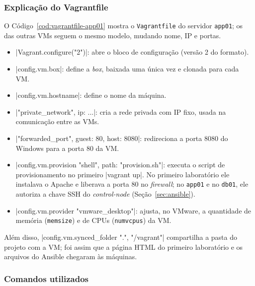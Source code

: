 \subsubsection{Explicação do Vagrantfile}

O Código~\ref{cod:vagrantfile-app01} mostra o \texttt{Vagrantfile} do servidor \texttt{app01}; os das
outras VMs seguem o mesmo modelo, mudando nome, IP e portas.


\begin{itemize}
  \item \cod|Vagrant.configure("2")|: abre o bloco de configuração (versão 2 do formato).
  \item \cod|config.vm.box|: define a \textit{box}, baixada uma única vez e clonada para cada VM.
  \item \cod|config.vm.hostname|: define o nome da máquina.
  \item \cod|"private_network", ip: ...|: cria a rede privada com IP fixo, usada na comunicação
        entre as VMs.
  \item \cod|"forwarded_port", guest: 80, host: 8080|: redireciona a porta 8080 do Windows para a
        porta 80 da VM.
  \item \cod|config.vm.provision "shell", path: "provision.sh"|: executa o script de
        provisionamento no primeiro \cod|vagrant up|. No primeiro laboratório ele instalava o Apache
        e liberava a porta 80 no \textit{firewall}; no \texttt{app01} e no \texttt{db01}, ele
        autoriza a chave SSH do \textit{control-node} (Seção~\ref{sec:ansible}).
  \item \cod|config.vm.provider "vmware_desktop"|: ajusta, no VMware, a quantidade de memória
        (\texttt{memsize}) e de CPUs (\texttt{numvcpus}) da VM.
\end{itemize}

Além disso, \cod|config.vm.synced_folder ".", "/vagrant"| compartilha a pasta do projeto com a VM;
foi assim que a página HTML do primeiro laboratório e os arquivos do Ansible chegaram às máquinas.

\subsubsection{Comandos utilizados}

